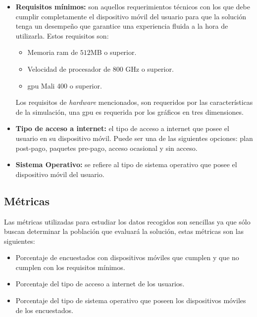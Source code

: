 \begin{itemize}

\item \textbf{Requisitos mínimos:} son aquellos requerimientos técnicos con los que 
    debe cumplir completamente el dispositivo móvil del usuario para que la 
    solución tenga un desempeño que garantice una experiencia fluida a la hora de 
    utilizarla. Estos requisitos son:
    \begin{itemize}
        \item Memoria ram de $512$MB o superior.
        \item Velocidad de procesador de $800$ GHz o superior.
        \item \Gls{gpu} Mali 400 o superior.
    \end{itemize}
    Los requisitos de \textit{hardware} mencionados, son requeridos por las
    características de la simulación, una \Gls{gpu} es requerida por los gráficos en 
    tres dimensiones.

\item \textbf{Tipo de acceso a internet:} el tipo de acceso a internet que posee el 
    usuario en su dispositivo móvil. Puede ser una de las siguientes opciones:
    plan post-pago, paquetes pre-pago, acceso ocasional y sin acceso.
    
\item \textbf{Sistema Operativo:} se refiere al tipo de sistema operativo que posee 
    el dispositivo móvil del usuario.
    
\end{itemize}

\subsection{Métricas}

Las métricas utilizadas para estudiar los datos recogidos son sencillas ya que sólo buscan 
determinar la población que evaluará la solución, estas métricas son las siguientes:

\begin{itemize}
\item Porcentaje de encuestados con dispositivos móviles que cumplen y que no cumplen con 
los requisitos mínimos.
\item Porcentaje del tipo de acceso a internet de los usuarios.
\item Porcentaje del tipo de sistema operativo que poseen los dispositivos móviles de los 
encuestados.
\end{itemize}







